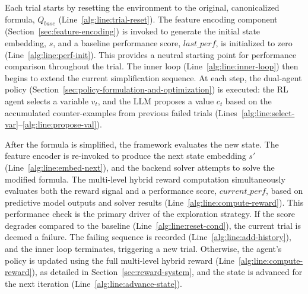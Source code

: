Each trial starts by resetting the environment to the original, canonicalized formula, $Q_{base}$ (Line~\ref{alg:line:trial-reset}). The feature encoding component (Section~\ref{sec:feature-encoding}) is invoked to generate the initial state embedding, $s$, and a baseline performance score, $last\_perf$, is initialized to zero (Line~\ref{alg:line:perf-init}). This provides a neutral starting point for performance comparison throughout the trial. The inner loop (Line~\ref{alg:line:inner-loop}) then begins to extend the current simplification sequence. At each step, the dual-agent policy (Section~\ref{sec:policy-formulation-and-optimization}) is executed: the RL agent selects a variable $v_t$, and the LLM proposes a value $c_t$ based on the accumulated counter-examples from previous failed trials (Lines~\ref{alg:line:select-var}--\ref{alg:line:propose-val}).

After the formula is simplified, the framework evaluates the new state. The feature encoder is re-invoked to produce the next state embedding $s'$ (Line~\ref{alg:line:embed-next}), and the backend solver attempts to solve the modified formula. The multi-level hybrid reward computation simultaneously evaluates both the reward signal and a performance score, $current\_perf$, based on predictive model outputs and solver results (Line~\ref{alg:line:compute-reward}). This performance check is the primary driver of the exploration strategy. If the score degrades compared to the baseline (Line~\ref{alg:line:reset-cond}), the current trial is deemed a failure. The failing sequence is recorded (Line~\ref{alg:line:add-history}), and the inner loop terminates, triggering a new trial. Otherwise, the agent's policy is updated using the full multi-level hybrid reward (Line~\ref{alg:line:compute-reward}), as detailed in Section~\ref{sec:reward-system}, and the state is advanced for the next iteration (Line~\ref{alg:line:advance-state}).

